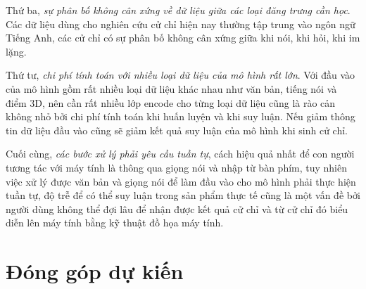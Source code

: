 Thứ ba, \textit{sự phân bố không cân xứng về  dữ liệu giữa các loại đăng trưng cần học}. Các dữ liệu dùng cho nghiên cứu cử chỉ hiện nay thường tập trung vào ngôn ngữ Tiếng Anh, các cử chỉ có sự phân bố không cân xứng giữa khi nói, khi hỏi, khi im lặng.

Thứ tư, \textit{chi phí tính toán với nhiều loại dữ liệu của mô hình rất lớn}. Với đầu vào của mô hình gồm rất nhiều loại dữ liệu khác nhau như văn bản, tiếng nói và điểm 3D, nên cần rất nhiều lớp encode cho từng loại dữ liệu cũng là rào cản không nhỏ bởi chi phí tính toán khi huấn luyện và khi suy luận. Nếu giảm thông tin dữ liệu đầu vào cũng sẽ giảm kết quả suy luận của mô hình khi sinh cử chỉ.

Cuối cùng, \textit{các bước xử lý phải yêu cầu tuần tự}, cách hiệu quả nhất để con người tương tác với máy tính là thông qua giọng nói và nhập từ bàn phím, tuy nhiên việc xử lý được văn bản và giọng nói để làm đầu vào cho mô hình phải thực hiện tuần tự, độ trễ để có thể suy luận trong sản phẩm thực tế cũng là một vấn đề bởi người dùng không thể đợi lâu để nhận được kết quả cử chỉ và từ cử chỉ đó biểu diễn lên máy tính bằng kỹ thuật đồ họa máy tính.


\section{Đóng góp dự kiến}

